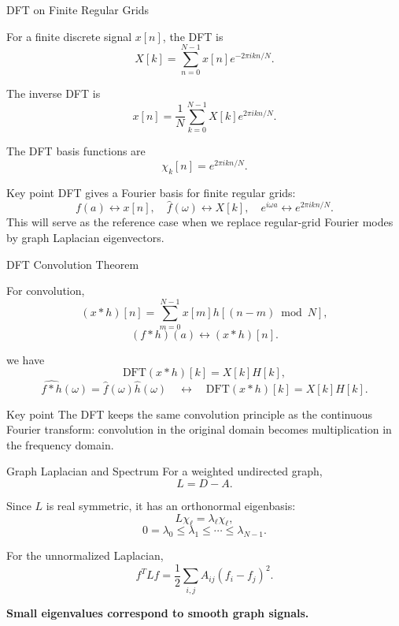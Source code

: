 \documentclass[aspectratio=1610,xcolor=dvipsnames,t]{beamer}
\newcommand{\keyterm}[1]{\textcolor{unirot}{\textbf{#1}}}
\begin{document}
\begin{frame}[t]{DFT on Finite Regular Grids}

\setlength{\abovedisplayskip}{3pt}
\setlength{\belowdisplayskip}{3pt}
\setlength{\abovedisplayshortskip}{2pt}
\setlength{\belowdisplayshortskip}{2pt}

For a finite discrete signal $x[n]$, the DFT is
\[
X[k]
=
\sum_{n=0}^{N-1}
x[n]e^{-2\pi i kn/N}.
\]

\vspace{-0.5em}

The inverse DFT is
\[
x[n]
=
\frac{1}{N}
\sum_{k=0}^{N-1}
X[k]e^{2\pi i kn/N}.
\]

\vspace{-0.5em}

The DFT basis functions are
\[
\chi_k[n]
=
e^{2\pi i kn/N}.
\]

\vspace{-0.4em}

\begin{block}{Key point}
DFT gives a Fourier basis for finite regular grids:
\[
f(a)\leftrightarrow x[n],
\quad
\widehat f(\omega)\leftrightarrow X[k],
\quad
e^{i\omega a}\leftrightarrow e^{2\pi i kn/N}.
\]
This will serve as the reference case when we replace regular-grid Fourier modes by graph Laplacian eigenvectors.
\end{block}

\end{frame}

\begin{frame}{DFT Convolution Theorem}

For convolution,
\[
(x*h)[n]
=
\sum_{m=0}^{N-1}
x[m]h[(n-m)\bmod N],
\]
\[
(f*h)(a)
\leftrightarrow
(x*h)[n].
\]

we have
\[
\mathrm{DFT}(x*h)[k]
=
X[k]H[k],
\]
\[
\widehat{f*h}(\omega)
=
\widehat f(\omega)\widehat h(\omega)
\quad\leftrightarrow\quad
\mathrm{DFT}(x*h)[k]
=
X[k]H[k].
\]

\begin{block}{Key point}
The DFT keeps the same convolution principle as the continuous Fourier transform: convolution in the original domain becomes multiplication in the frequency domain.
\end{block}

\end{frame}

\begin{frame}{Graph Laplacian and Spectrum}
For a weighted undirected graph,
\[
L=D-A.
\]

Since $L$ is real symmetric, it has an orthonormal eigenbasis:
\[
L\chi_\ell
=
\lambda_\ell\chi_\ell,
\]
\[
0=\lambda_0
\leq
\lambda_1
\leq
\cdots
\leq
\lambda_{N-1}.
\]

For the unnormalized Laplacian,
\[
f^TLf
=
\frac{1}{2}
\sum_{i,j}
A_{ij}(f_i-f_j)^2.
\]

\begin{center}
\keyterm{Small eigenvalues correspond to smooth graph signals.}
\end{center}
\end{frame}
\end{document}
